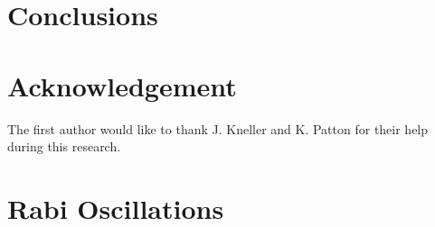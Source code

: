 \documentclass[%
reprint,
 amsmath,amssymb,
 aps,
]{revtex4-1}
\begin{document}
\section{\label{conclusions}Conclusions}






\section{\label{acknowledgement}Acknowledgement}

The first author would like to thank J. Kneller and K. Patton for their help during this research.









\appendix


\section{\label{sec:rabi-oscillations}Rabi Oscillations}

\end{document}
